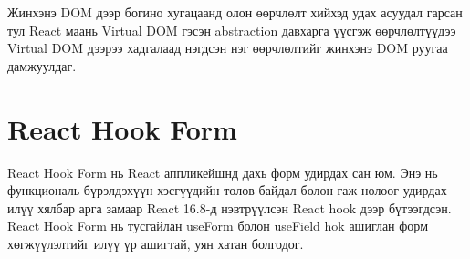Жинхэнэ DOM дээр богино хугацаанд олон өөрчлөлт хийхэд удах асуудал гарсан тул React маань Virtual DOM гэсэн abstraction давхарга үүсгэж өөрчлөлтүүдээ Virtual DOM дээрээ хадгалаад нэгдсэн нэг өөрчлөлтийг жинхэнэ DOM руугаа дамжуулдаг.

\section{React Hook Form}
React Hook Form нь React аппликейшнд дахь форм удирдах сан юм. Энэ нь функциональ бүрэлдэхүүн хэсгүүдийн төлөв байдал болон гаж нөлөөг удирдах илүү хялбар арга замаар React 16.8-д нэвтрүүлсэн React hook дээр бүтээгдсэн. React Hook Form нь тусгайлан useForm болон useField hok ашиглан форм хөгжүүлэлтийг илүү үр ашигтай, уян хатан болгодог.